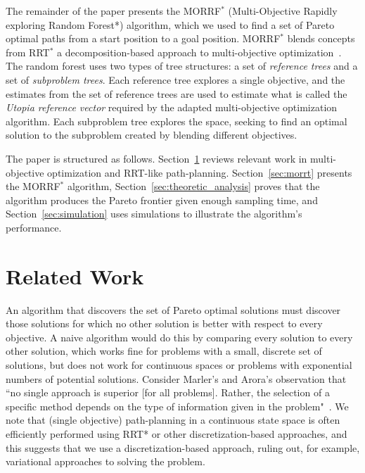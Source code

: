 \documentclass[conference]{IEEEtran}
\begin{document}
The remainder of the paper presents the MORRF$^{*}$ (Multi-Objective Rapidly exploring Random Forest*) algorithm, which we used to find a set of Pareto optimal paths from a start position to a goal position.  
MORRF$^{*}$ blends concepts from RRT$^{*}$ a decomposition-based approach to multi-objective optimization~\cite{4358754}.  
The random forest uses two types of tree structures: a set of {\em reference trees} and a set of {\em subproblem trees}.  
Each reference tree explores a single objective, and the estimates from the set of reference trees are used to estimate what is called the {\em Utopia reference vector} required by the adapted multi-objective optimization algorithm.  
Each subproblem tree explores the space, seeking to find an optimal solution to the subproblem created by blending different objectives. 

The paper is structured as follows.  
Section~\ref{sec:related_works} reviews relevant work in multi-objective optimization and RRT-like path-planning. 
Section~\ref{sec:morrt} presents the MORRF$^{*}$ algorithm,  
Section~\ref{sec:theoretic_analysis} proves that the algorithm produces the Pareto frontier given enough sampling time, 
and Section~\ref{sec:simulation} uses simulations to illustrate the algorithm's performance.

\section{Related Work}
\label{sec:related_works}

An algorithm that discovers the set of Pareto optimal solutions must discover those solutions for which no other solution is better with respect to every objective.  A naive algorithm would do this by comparing every solution to every other solution, which works fine for problems with a small, discrete set of solutions, but does not work for continuous spaces or problems with exponential numbers of potential solutions.  
Consider Marler's and Arora's observation that ``no single approach is superior [for all problems].  
Rather, the selection of a specific method depends on the type of information given in the problem"~\cite{marler2004survey}.  
We note that (single objective) path-planning in a continuous state space is often efficiently performed using RRT* or other discretization-based approaches, and this suggests that we use a discretization-based approach, ruling out, for example, variational approaches to solving the problem.    
\end{document}
